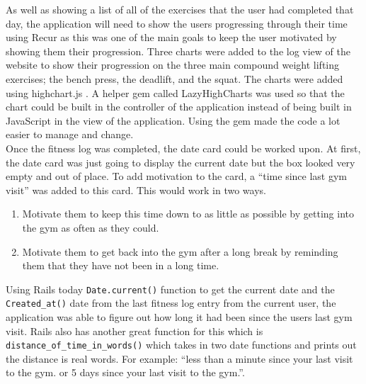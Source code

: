 As well as showing a list of all of the exercises that the user had completed that day, the application will need to show the users progressing through their time using Recur as this was one of the main goals to keep the user motivated by showing them their progression. Three charts were added to the log view of the website to show their progression on the three main compound weight lifting exercises; the bench press, the deadlift, and the squat. The charts were added using highchart.js \citep{highcharts:2009}. A helper gem called LazyHighCharts \citep{lhc:2010} was used so that the chart could be built in the controller of the application instead of being built in JavaScript in the view of the application. Using the gem made the code a lot easier to manage and change.\\

Once the fitness log was completed, the date card could be worked upon. At first, the date card was just going to display the current date but the box looked very empty and out of place. To add motivation to the card, a ``time since last gym visit'' was added to this card. This would work in two ways.

\begin{enumerate}
\item Motivate them to keep this time down to as little as possible by getting into the gym as often as they could.
\item Motivate them to get back into the gym after a long break by reminding them that they have not been in a long time.
\end{enumerate}

Using Rails today \lstinline{Date.current()} function to get the current date and the \lstinline{Created_at()} date from the last fitness log entry from the current user, the application was able to figure out how long it had been since the users last gym visit. Rails also has another great function for this which is \lstinline{distance_of_time_in_words()} which takes in two date functions and prints out the distance is real words. For example: ``less than a minute since your last visit to the gym. or 5 days since your last visit to the gym.''.\\

